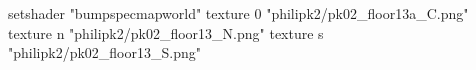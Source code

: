 setshader "bumpspecmapworld"
    texture 0 "philipk2/pk02_floor13a_C.png"
    texture n "philipk2/pk02_floor13_N.png"
    texture s "philipk2/pk02_floor13_S.png"